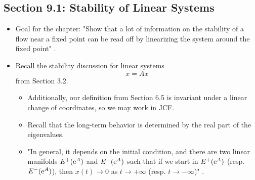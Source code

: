 \documentclass[../notes.tex]{subfiles}
\begin{document}
\subsection*{Section 9.1: Stability of Linear Systems}
\begin{itemize}
    \item {}Goal for the chapter: "Show that a lot of information on the stability of a flow near a fixed point can be read off by linearizing the system around the fixed point" \parencite[253]{bib:Teschl}.
    \item Recall the stability discussion for linear systems
    \begin{equation*}
        \dot{x} = Ax
    \end{equation*}
    from Section 3.2.
    \begin{itemize}
        \item Additionally, our definition from Section 6.5 is invariant under a linear change of coordinates, so we may work in JCF.
        \item Recall that the long-term behavior is determined by the real part of the eigenvalues.
        \item "In general, it depends on the initial condition, and there are two linear manifolds $E^+(\e[A])$ and $E^-(\e[A])$ such that if we start in $E^+(\e[A])$ (resp. $E^-(\e[A])$), then $x(t)\to 0$ as $t\to +\infty$ (resp. $t\to -\infty$)" \parencite[253]{bib:Teschl}.
    \end{itemize}
\end{itemize}
\end{document}
